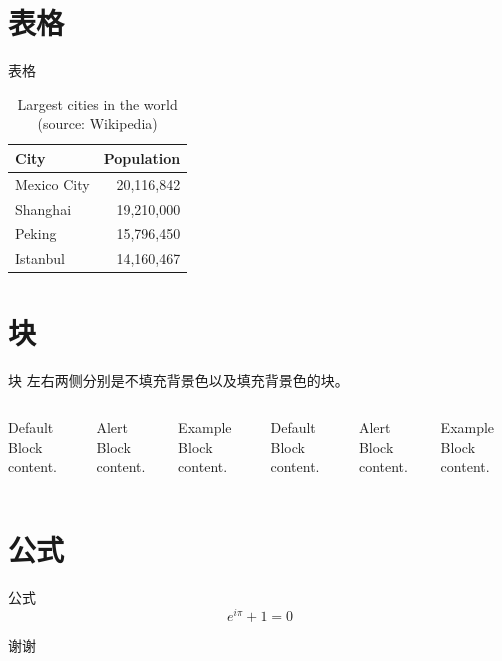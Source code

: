\documentclass[10pt, aspectraio=169]{beamer}  %
\begin{document}
\section{表格}
\begin{frame}{表格}
    \begin{table}
        \caption{Largest cities in the world (source: Wikipedia)}
        \begin{tabular}{lr}
            \toprule
            City & Population\\
            \midrule
            Mexico City & 20,116,842\\
            Shanghai & 19,210,000\\
            Peking & 15,796,450\\
            Istanbul & 14,160,467\\
            \bottomrule
        \end{tabular}
      \end{table}
\end{frame}

\section{块}
\begin{frame}{块}
    左右两侧分别是不填充背景色以及填充背景色的块。
    \begin{columns}[T,onlytextwidth]
            \begin{block}{Default}
                Block content.
            \end{block}
            \begin{alertblock}{Alert}
                Block content.
            \end{alertblock}
            \begin{exampleblock}{Example}
                Block content.
            \end{exampleblock}

            \begin{block}{Default}
                Block content.
            \end{block}
            \begin{alertblock}{Alert}
                Block content.
            \end{alertblock}
            \begin{exampleblock}{Example}
                Block content.
            \end{exampleblock}
    \end{columns}
\end{frame}

\section{公式}
\begin{frame}{公式}
    \begin{equation*}
        e^{i\pi} + 1 = 0
    \end{equation*}
\end{frame}

\begin{frame}[standout]
  谢谢
\end{frame}
\end{document}
